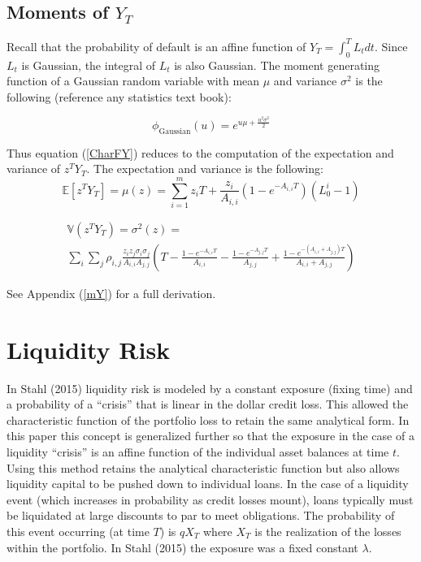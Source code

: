 \documentclass[12pt]{article}
\theoremstyle{definition}
\begin{document}
\subsection{Moments of \(Y_T\)} 

Recall that the probability of default is an affine function of \(Y_T=\int_0^T L_t dt\).  Since \(L_t\) is Gaussian, the integral of \(L_t\) is also Gaussian.  The moment generating function of a Gaussian random variable with mean \(\mu\) and variance \(\sigma^2\) is the following (reference any statistics text book):

\begin{equation}\phi_{\mathrm{Gaussian}}(u)=\label{GaussianMGF} e^{u\mu +\frac{u^2\sigma^2}{2}} \end{equation}

Thus equation (\ref{CharFY}) reduces to the computation of the expectation and variance of \(z^T Y_T\).  The expectation and variance is the following:
\begin{equation} \label{meY} \mathbb{E}[z^T Y_T]=\mu(z)=\sum_{i=1} ^ m z_i T+\frac{z_i}{A_{i,i}}\left(1-e^{-{A}_{i, i}T}\right)(L_0^ i-1)\end{equation}

\begin{multline}\label{varianceY} \mathbb{V}(z^T Y_T)=\sigma^2(z)=\\ \sum_i \sum_j \rho_{i,j} \frac{ z_i z_j \sigma_i \sigma_j}{A_{i,i} A_{j,j}} \left(T-\frac{1-e^{-A_{i,i}T}}{A_{i,i}}-\frac{1-e^{-A_{j,j}T}}{A_{j,j}}+\frac{1-e^{-(A_{i,i}+A_{j,j})T}}{A_{i,i}+A_{j,j}}\right) \end{multline}

See Appendix (\ref{mY}) for a full derivation.

\section{Liquidity Risk} \label{riskContributions}
In Stahl (2015) liquidity risk is modeled by a constant exposure (fixing time) and a probability of a ``crisis'' that is linear in the dollar credit loss.  This allowed the characteristic function of the portfolio loss to retain the same analytical form.  In this paper this concept is generalized further so that the exposure in the case of a liquidity ``crisis'' is an affine function of the individual asset balances at time \(t\).  Using this method retains the analytical characteristic function but also allows liquidity capital to be pushed down to individual loans.  In the case of a liquidity event (which increases in probability as credit losses mount), loans typically must be liquidated at large discounts to par to meet obligations.  The probability of this event occurring (at time \(T\)) is \(q X_T\) where \(X_T\) is the realization of the losses within the portfolio.  In Stahl (2015) the exposure was a fixed constant \(\lambda\).  
\end{document}

